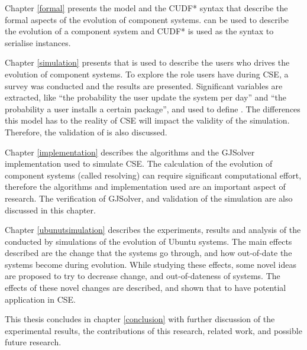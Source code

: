 Chapter \ref{formal} presents the \modelname model and the CUDF* syntax that describe the formal aspects of the evolution of component systems.
\modelname can be used to describe the evolution of a component system and CUDF* is used as the syntax to serialise \modelname instances.

Chapter \ref{simulation} presents \usermodel that is used to describe the users who drives the evolution of component systems.
To explore the role users have during CSE, a survey was conducted and the results are presented.
Significant variables are extracted, like ``the probability the user update the system per day'' and ``the probability a user installs a certain package'',
and used to define \usermodel.
The differences this model has to the reality of CSE will impact the validity of the simulation.
Therefore, the validation of \usermodel is also discussed.

Chapter \ref{implementation} describes the algorithms and the GJSolver implementation used to simulate CSE.
The calculation of the evolution of component systems (called resolving) can require significant computational effort,
therefore the algorithms and implementation used are an important aspect of research.
The verification of GJSolver, and validation of the simulation are also discussed in this chapter.

Chapter \ref{ubunutsimulation} describes the experiments, results and analysis of the conducted by simulations of the evolution of Ubuntu systems.
The main effects described are the change that the systems go through, and how out-of-date the systems become during evolution.
While studying these effects, some novel ideas are proposed to try to decrease change, and out-of-dateness of systems.
The effects of these novel changes are described, and shown that to have potential application in CSE.

This thesis concludes in chapter \ref{conclusion} with further discussion of the experimental results, the contributions of this research, related work, and possible future research.

